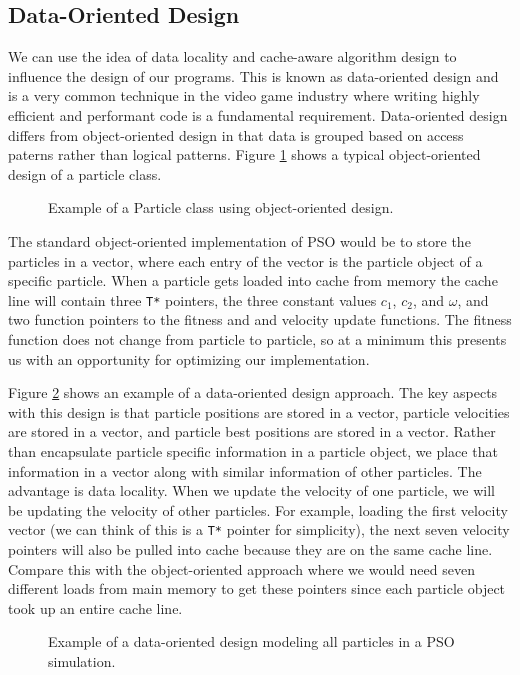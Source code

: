 \subsection{Data-Oriented Design}
We can use the idea of data locality and cache-aware algorithm design to
influence the design of our programs. This is known as data-oriented design and
is a very common technique in the video game industry where writing highly
efficient and performant code is a fundamental requirement. Data-oriented design
differs from object-oriented design in that data is grouped based on access
paterns rather than logical patterns. Figure \ref{fig:particle} shows a typical
object-oriented design of a particle class.

\begin{figure}
  
  \caption{Example of a Particle class using object-oriented
    design.}\label{fig:particle}
\end{figure}

The standard object-oriented implementation of PSO would be to store the
particles in a vector, where each entry of the vector is the particle object of
a specific particle. When a particle gets loaded into cache from memory the
cache line will contain three \texttt{T*} pointers, the three constant values
$c_1$, $c_2$, and $\omega$, and two function pointers to the fitness and and
velocity update functions. The fitness function does not change from particle to
particle, so at a minimum this presents us with an opportunity for
optimizing our implementation.

Figure \ref{fig:particles} shows an example of a data-oriented design
approach. The key aspects with this design is that particle positions are stored
in a vector, particle velocities are stored in a vector, and particle best
positions are stored in a vector. Rather than encapsulate particle specific
information in a particle object, we place that information in a vector along
with similar information of other particles. The advantage is data
locality. When we update the velocity of one particle, we will be updating the
velocity of other particles. For example, loading the first velocity vector (we
can think of this is a \texttt{T*} pointer for simplicity), the next seven
velocity pointers will also be pulled into cache because they are on the same
cache line. Compare this with the object-oriented approach where we would need
seven different loads from main memory to get these pointers since each particle
object took up an entire cache line.
\begin{figure}
  
  \caption{Example of a data-oriented design modeling all particles in a PSO
    simulation.}\label{fig:particles}
\end{figure}

